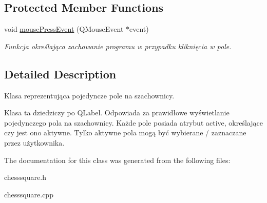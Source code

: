 \subsection*{Protected Member Functions}
\begin{DoxyCompactItemize}
\item 
\mbox{\label{classchess_square_a237c7ccd0ba13d99c0f6eff2162fbf48}} 
void \hyperlink{classchess_square_a237c7ccd0ba13d99c0f6eff2162fbf48}{mouse\+Press\+Event} (Q\+Mouse\+Event $\ast$event)
\begin{DoxyCompactList}\small\item\em Funkcja określająca zachowanie programu w przypadku kliknięcia w pole. \end{DoxyCompactList}\end{DoxyCompactItemize}


\subsection{Detailed Description}
Klasa reprezentująca pojedyncze pole na szachownicy. 

Klasa ta dziedziczy po Q\+Label. Odpowiada za prawidłowe wyświetlanie pojedynczego pola na szachownicy. Każde pole posiada atrybut active, określające czy jest ono aktywne. Tylko aktywne pola mogą być wybierane / zaznaczane przez użytkownika. 

The documentation for this class was generated from the following files\+:\begin{DoxyCompactItemize}
\item 
chesssquare.\+h\item 
chesssquare.\+cpp\end{DoxyCompactItemize}
